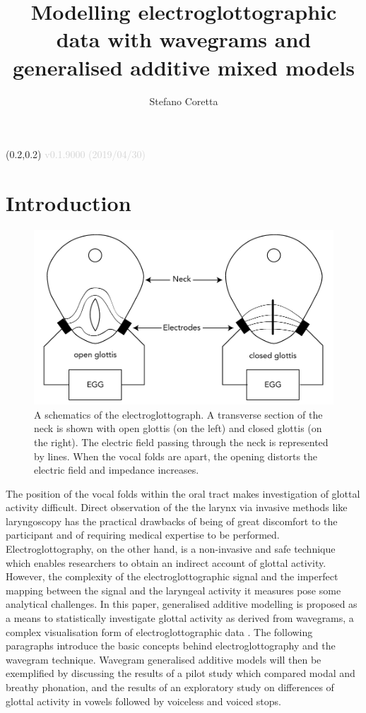 \documentclass[
  11pt,
  a4paper,
]{article}
\title{Modelling electroglottographic data with wavegrams and generalised
additive mixed models}
\author{Stefano Coretta}
\date{}
\begin{document}
\begin{textblock}{3}(0.2,0.2)
  \textcolor{lightgray}{v0.1.9000 (2019/04/30)}
\end{textblock}
\maketitle

\hypertarget{introduction}{%
\section{Introduction}\label{introduction}}

\begin{figure}
  \centering
  \includegraphics{./img/egg-setup.pdf}
  \caption{A schematics of the electroglottograph. A transverse section of the neck is shown with open glottis (on the left) and closed glottis (on the right). The electric field passing through the neck is represented by lines. When the vocal folds are apart, the opening distorts the electric field and impedance increases.}
  \label{f:egg-setup}
\end{figure}

The position of the vocal folds within the oral tract makes
investigation of glottal activity difficult. Direct observation of the
the larynx via invasive methods like laryngoscopy has the practical
drawbacks of being of great discomfort to the participant and of
requiring medical expertise to be performed. Electroglottography, on the
other hand, is a non-invasive and safe technique which enables
researchers to obtain an indirect account of glottal activity. However,
the complexity of the electroglottographic signal and the imperfect
mapping between the signal and the laryngeal activity it measures pose
some analytical challenges. In this paper, generalised additive
modelling \citep{hastie1986} is proposed as a means to statistically
investigate glottal activity as derived from wavegrams, a complex
visualisation form of electroglottographic data \citep{herbst2010}. The
following paragraphs introduce the basic concepts behind
electroglottography and the wavegram technique. Wavegram generalised
additive models will then be exemplified by discussing the results of a
pilot study which compared modal and breathy phonation, and the results
of an exploratory study on differences of glottal activity in vowels
followed by voiceless and voiced stops.
\end{document}
